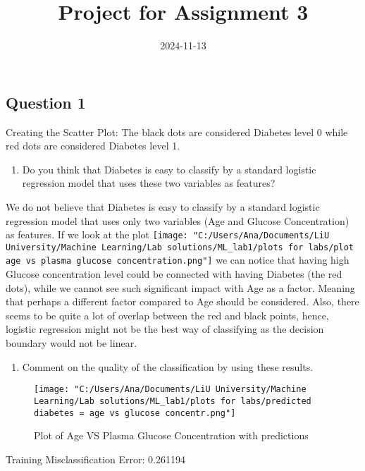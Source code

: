 \documentclass[
]{article}
\title{Project for Assignment 3}
\author{}
\date{\vspace{-2.5em}2024-11-13}
\providecommand{\tightlist}{%
  \setlength{\itemsep}{0pt}\setlength{\parskip}{0pt}}
\begin{document}
\maketitle

\subsection{Question 1}\label{question-1}

Creating the Scatter Plot: The black dots are considered Diabetes level
0 while red dots are considered Diabetes level 1.

\begin{enumerate}
\def\labelenumi{\arabic{enumi}.}
\tightlist
\item
  Do you think that Diabetes is easy to classify by a standard logistic
  regression model that uses these two variables as features?
\end{enumerate}

We do not believe that Diabetes is easy to classify by a standard
logistic regression model that uses only two variables (Age and Glucose
Concentration) as features. If we look at the plot
\texttt{[image: "C:/Users/Ana/Documents/LiU University/Machine Learning/Lab solutions/ML\_lab1/plots for labs/plot age vs plasma glucose concentration.png"]}
we can notice that having high Glucose concentration level could be
connected with having Diabetes (the red dots), while we cannot see such
significant impact with Age as a factor. Meaning that perhaps a
different factor compared to Age should be considered. Also, there seems
to be quite a lot of overlap between the red and black points, hence,
logistic regression might not be the best way of classifying as the
decision boundary would not be linear.

\begin{enumerate}
\def\labelenumi{\arabic{enumi}.}
\setcounter{enumi}{1}
\tightlist
\item
  Comment on the quality of the classification by using these results.
\end{enumerate}

\begin{figure}
\centering
\texttt{[image: "C:/Users/Ana/Documents/LiU University/Machine Learning/Lab solutions/ML\_lab1/plots for labs/predicted diabetes = age vs glucose concentr.png"]}
\caption{Plot of Age VS Plasma Glucose Concentration with predictions}
\end{figure}

Training Misclassification Error: 0.261194
\end{document}
